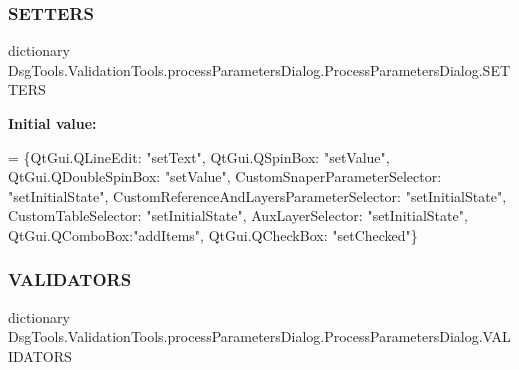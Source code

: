\subsubsection{\texorpdfstring{S\+E\+T\+T\+E\+RS}{SETTERS}}
{\footnotesize\ttfamily dictionary Dsg\+Tools.\+Validation\+Tools.\+process\+Parameters\+Dialog.\+Process\+Parameters\+Dialog.\+S\+E\+T\+T\+E\+RS\hspace{0.3cm}{\ttfamily [static]}}

{\bfseries Initial value\+:}
\begin{DoxyCode}
=  \{QtGui.QLineEdit: \textcolor{stringliteral}{"setText"},
               QtGui.QSpinBox: \textcolor{stringliteral}{"setValue"},
               QtGui.QDoubleSpinBox: \textcolor{stringliteral}{"setValue"},
               CustomSnaperParameterSelector: \textcolor{stringliteral}{"setInitialState"},
               CustomReferenceAndLayersParameterSelector: \textcolor{stringliteral}{"setInitialState"},
               CustomTableSelector: \textcolor{stringliteral}{"setInitialState"},
               AuxLayerSelector: \textcolor{stringliteral}{"setInitialState"},
               QtGui.QComboBox:\textcolor{stringliteral}{"addItems"},
               QtGui.QCheckBox: \textcolor{stringliteral}{"setChecked"}\}
\end{DoxyCode}
\mbox{\label{class_dsg_tools_1_1_validation_tools_1_1process_parameters_dialog_1_1_process_parameters_dialog_abbfa157cfc71ec5864691617ffb49831}} 
\subsubsection{\texorpdfstring{V\+A\+L\+I\+D\+A\+T\+O\+RS}{VALIDATORS}}
{\footnotesize\ttfamily dictionary Dsg\+Tools.\+Validation\+Tools.\+process\+Parameters\+Dialog.\+Process\+Parameters\+Dialog.\+V\+A\+L\+I\+D\+A\+T\+O\+RS\hspace{0.3cm}{\ttfamily [static]}}

